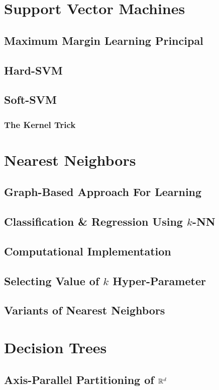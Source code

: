\documentclass[11pt,fleqn]{book} %
\begin{document}
    \section{Support Vector Machines}
        \subsection{Maximum Margin Learning Principal}
        \subsection{Hard-SVM}
        \subsection{Soft-SVM}
            \subsubsection{The Kernel Trick}
        
    \section{Nearest Neighbors}
        \subsection{Graph-Based Approach For Learning}
        \subsection{Classification \& Regression Using $k$-NN}
        \subsection{Computational Implementation}
        \subsection{Selecting Value of $k$ Hyper-Parameter}
        \subsection{Variants of Nearest Neighbors}
        
    \section{Decision Trees}
        \subsection{Axis-Parallel Partitioning of $\mathbb{R}^d$}
\end{document}
